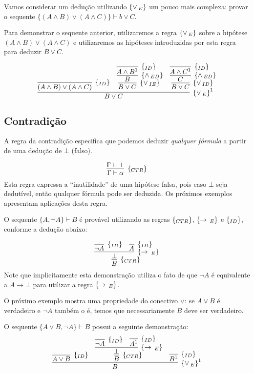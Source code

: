 \begin{Example}
Vamos considerar um dedução utilizando $\scriptsize{\{\lor\,_{E}\}}$ um pouco mais complexa:
provar o sequente $\{(A \land B) \lor (A \land C)\}\vdash b \lor C$.

Para demonstrar o sequente anterior, utilizaremos a regra $\scriptsize{\{\lor\,_{E}\}}$ sobre
a hipótese $(A \land B)\lor (A \land C)$ e utilizaremos as hipóteses
introduzidas por esta regra para deduzir $B\lor C$.

\[
\infer[\orE^1]{B \lor C}
        {
          \infer[\Id]{(A \land B)\lor (A\land C)}{} &
          \infer[\orIE]{B \lor C}
                  {
                     \infer[\andED]{B}
                             {
                               \infer[\Id]{A\land B^1}{}
                             }
                  } &
          \infer[\orID]{B \lor C}
                  {
                     \infer[\andED]{C}
                             {
                               \infer[\Id]{A\land C^1}{}
                             }
                  }
        }
\]

\end{Example}

\subsection{Contradição}

A regra da contradição especifica que podemos deduzir \emph{qualquer
  fórmula} a partir de uma dedução de $\bot$ (falso).

\[
\infer[\ctr]{\Gamma \vdash \alpha}
                 {\Gamma \vdash \bot}
\]
Esta regra expressa a ``inutilidade'' de uma hipótese falsa, pois caso
$\bot$ seja dedutível, então qualquer fórmula pode ser deduzida. Os
próximos exemplos apresentam aplicações desta regra.

\begin{Example}
O sequente $\{A, \neg A \}\vdash B$ é provável utilizando as regras
$\scriptsize{\{_{CTR}\}}$, $\scriptsize{\{\to\,_E\}}$ e $\scriptsize{\{_{ID}\}}$, conforme a dedução abaixo:

\[
\infer[\ctr]{B}
        {
           \infer[\impE]{\bot}
                    {
                         \infer[\Id]{\neg A}{} &
                         \infer[\Id]{A}{}
                    }
        }
\]
Note que implicitamente esta demonstração utiliza o fato de que $\neg
A$ é equivalente a $A \to \bot$ para utilizar a regra $\scriptsize{\{\to\,_E\}}$.
\end{Example}
O próximo exemplo mostra uma propriedade do conectivo $\lor$: se
$A\lor B$ é verdadeiro e $\neg A$ também o é, temos que
necessariamente $B$ deve ser verdadeiro.
\begin{Example}
O sequente $\{A \lor B,\neg A\}\vdash B$ possui a seguinte
demonstração:
\[
\infer[\orE^1]{B}
         {
           \infer[\Id]{A\lor B}{} &
           \infer[\ctr]{B}
                  {
                    \infer[\impE]{\bot}
                            {
                              \infer[\Id]{\neg A}{} &
                              \infer[\Id]{A^1}{}
                            }
                  } &
           \infer[\Id]{B^1}{}
         }
\]
\end{Example}

